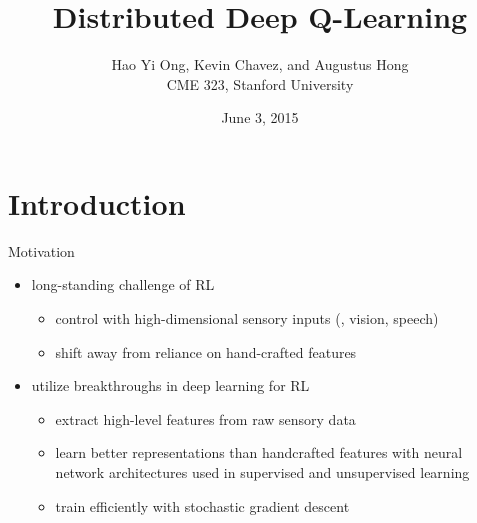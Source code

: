 



\title{\large \bfseries Distributed Deep Q-Learning}

\author{Hao Yi Ong, Kevin Chavez, and Augustus Hong\\[3ex]
CME 323, Stanford University}

\date{June 3, 2015}



\frame{
\thispagestyle{empty}
\titlepage
}

\section{Introduction}

\begin{frame}{Motivation}
  \begin{itemize}\itemsep=12pt
  
    \item long-standing challenge of RL
    \vspace*{0.5em}
    \begin{itemize}
        \item control with high-dimensional sensory inputs (\eg, vision, speech)
        \item shift away from reliance on hand-crafted features
    \end{itemize}
    
    \item utilize breakthroughs in deep learning for RL
    \vspace*{0.5em}
    \begin{itemize}
        \item extract high-level features from raw sensory data
        \item learn better representations than handcrafted features with neural network architectures used in supervised and unsupervised learning
        \item train efficiently with stochastic gradient descent
    \end{itemize}

  \end{itemize}
\end{frame}


